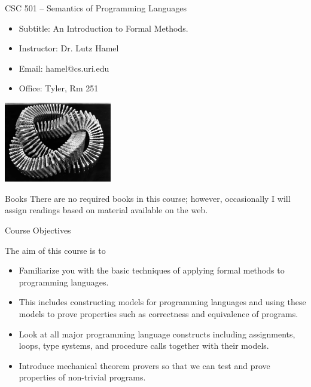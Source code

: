 \documentclass{beamer}
\begin{document}
\begin{frame}{CSC 501 -- Semantics of Programming Languages}
\begin{itemize}
\item Subtitle: An Introduction to Formal Methods.
\item	Instructor: Dr. Lutz Hamel
\item	Email: hamel@cs.uri.edu
\item	Office: Tyler, Rm 251
\end{itemize}

\vspace{.1in}

\begin{center}
    \includegraphics[height=35mm]{images/legoknot}
\end{center}

\end{frame}

\begin{frame}{Books}
There are no required books in this course; however, occasionally I will assign readings based on material 
available on the web.
\end{frame}

\begin{frame}{Course Objectives}

The aim of this course is to 
\begin{itemize}
\item Familiarize you with the basic techniques of applying formal methods to programming languages. 

\item This includes constructing models for programming languages and using these models to prove properties such as correctness and equivalence of programs. 

\item Look at all major programming language constructs including assignments, loops, type systems, and procedure calls together with their models. 

\item Introduce mechanical theorem provers so that we can test and prove properties of non-trivial programs.
\end{itemize}
\end{frame}
\end{document}
